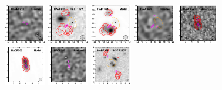 \documentclass[iop]{emulateapj}
\begin{document}
\begin{figure}[!tbp]
\begin{centering}
\includegraphics[width=0.162\textwidth]{../Figures/modelfit/HECDFS13_residual_bestfit.pdf}
\includegraphics[width=0.162\textwidth]{../Figures/modelfit/HADFS04_optical_bestfit.pdf}
\includegraphics[width=0.162\textwidth]{../Figures/modelfit/HADFS04_model_bestfit.pdf}
\includegraphics[width=0.162\textwidth]{../Figures/modelfit/HADFS04_residual_bestfit.pdf}
\includegraphics[width=0.162\textwidth]{../Figures/modelfit/HADFS02_optical_bestfit.pdf}
\includegraphics[width=0.162\textwidth]{../Figures/modelfit/HADFS02_model_bestfit.pdf}
\includegraphics[width=0.162\textwidth]{../Figures/modelfit/HADFS02_residual_bestfit.pdf}
\includegraphics[width=0.162\textwidth]{../Figures/modelfit/HADFS11_optical_bestfit.pdf}

\end{centering}
\end{figure}
\end{document}
